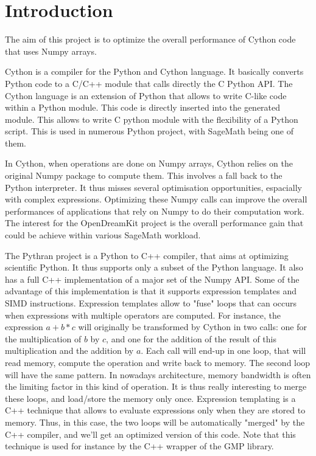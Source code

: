 \documentclass{deliverablereport}
\author{Clément Pernet}
\begin{document}
\maketitle
%
\strut\githubissuedescription
\newpage\tableofcontents\newpage

\section{Introduction}

The aim of this project is to optimize the overall performance of Cython code
that uses Numpy arrays.

Cython is a compiler for the Python and Cython language. It basically converts
Python code to a C/C++ module that calls directly the C Python API. The Cython
language is an extension of Python that allows to write C-like code within a
Python module. This code is directly inserted into the generated module. This
allows to write C python module with the flexibility of a Python script. This
is used in numerous Python project, with SageMath being one of them.

In Cython, when operations are done on Numpy arrays, Cython relies on the
original Numpy package to compute them. This involves a fall back to the Python
interpreter. It thus misses several optimisation opportunities, espacially with
complex expressions. Optimizing these Numpy calls can improve the overall
performances of applications that rely on Numpy to do their computation work.
The interest for the OpenDreamKit project is the overall performance gain that
could be achieve within various SageMath workload.

The Pythran project is a Python to C++ compiler, that aims at optimizing
scientific Python. It thus supports only a subset of the Python language.
It also has a full C++ implementation of a major set of the Numpy API. Some of
the advantage of this implementation is that it supports expression templates
and SIMD instructions. Expression templates allow to "fuse" loops that can
occurs when expressions with multiple operators are computed. For instance,
the expression $a+b*c$ will originally be transformed by Cython in two calls: one
for the multiplication of $b$ by $c$, and one for the addition of the result of
this multiplication and the addition by $a$. Each call will end-up in one loop,
that will read memory, compute the operation and write back to memory. The
second loop will have the same pattern. In nowadays architecture, memory
bandwidth is often the limiting factor in this kind of operation. It is thus
really interesting to merge these loops, and load/store the memory only once.
Expression templating is a C++ technique that allows to evaluate expressions
only when they are stored to memory. Thus, in this case, the two loops will be
automatically "merged" by the C++ compiler, and we'll get an optimized version
of this code. Note that this technique is used for instance by the C++ wrapper
of the GMP library.
\end{document}
